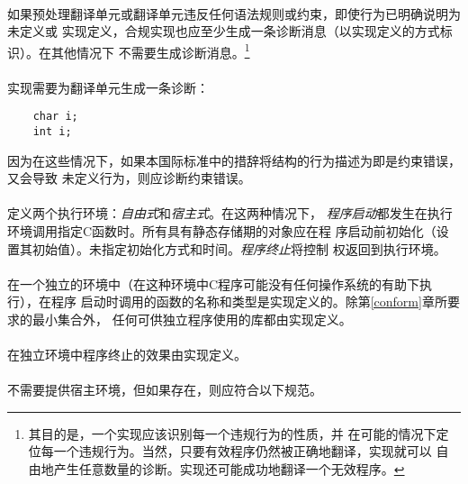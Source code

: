 \paragraph{}
如果预处理翻译单元或翻译单元违反任何语法规则或约束，即使行为已明确说明为未定义或
实现定义，合规实现也应至少生成一条诊断消息（以实现定义的方式标识）。在其他情况下
不需要生成诊断消息。\footnote{其目的是，一个实现应该识别每一个违规行为的性质，并
在可能的情况下定位每一个违规行为。当然，只要有效程序仍然被正确地翻译，实现就可以
自由地产生任意数量的诊断。实现还可能成功地翻译一个无效程序。}

\paragraph{}
\ex* 实现需要为翻译单元生成一条诊断：
\begin{lstlisting}
    char i;
    int i;
\end{lstlisting}
因为在这些情况下，如果本国际标准中的措辞将结构的行为描述为即是约束错误，又会导致
未定义行为，则应诊断约束错误。

\paragraph{}
定义两个执行环境：\textit{自由式}和\textit{宿主式}。在这两种情况下，
\textit{程序启动}都发生在执行环境调用指定C函数时。所有具有静态存储期的对象应在程
序启动前初始化（设置其初始值）。未指定初始化方式和时间。\textit{程序终止}将控制
权返回到执行环境。


\paragraph{}
在一个独立的环境中（在这种环境中C程序可能没有任何操作系统的有助下执行），在程序
启动时调用的函数的名称和类型是实现定义的。除第\ref{conform}章所要求的最小集合外，
任何可供独立程序使用的库都由实现定义。

\paragraph{}
在独立环境中程序终止的效果由实现定义。

\paragraph{}
不需要提供宿主环境，但如果存在，则应符合以下规范。

